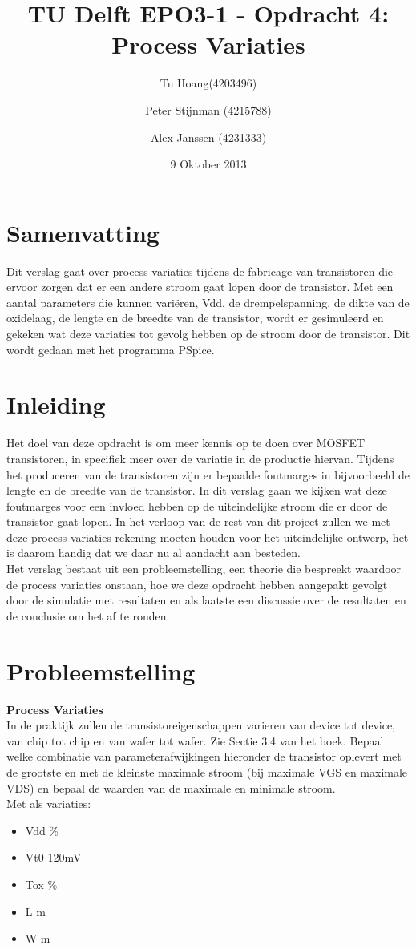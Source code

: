 \documentclass{article}
\author{
Tu Hoang(4203496) \and Peter Stijnman (4215788) \and Alex Janssen (4231333) \\
}
\title{TU Delft EPO3-1 - Opdracht 4: Process Variaties}
\date{9 Oktober 2013}
\begin{document}
\maketitle

\section{Samenvatting}

Dit verslag gaat over process variaties tijdens de fabricage van transistoren die ervoor zorgen dat er een andere stroom gaat lopen door de transistor. Met een aantal parameters die kunnen variëren, Vdd, de drempelspanning, de dikte van de oxidelaag, de lengte en de breedte van de transistor, wordt er gesimuleerd en gekeken wat deze variaties tot gevolg hebben op de stroom door de transistor. Dit wordt gedaan met het programma PSpice. 

\tableofcontents
\clearpage

\section{Inleiding}
Het doel van deze opdracht is om meer kennis op te doen over MOSFET transistoren, in specifiek meer over de variatie in de productie hiervan. Tijdens het produceren van de transistoren zijn er bepaalde foutmarges in bijvoorbeeld de lengte en de breedte van de transistor. In dit verslag gaan we kijken wat deze foutmarges voor een invloed hebben op de uiteindelijke stroom die er door de transistor gaat lopen. In het verloop van de rest van dit project zullen we met deze process variaties rekening moeten houden voor het uiteindelijke ontwerp, het is daarom handig dat we daar nu al aandacht aan besteden.\\
Het verslag bestaat uit een probleemstelling, een theorie die bespreekt waardoor de process variaties onstaan, hoe we deze opdracht hebben aangepakt gevolgt door de simulatie met resultaten en als laatste een discussie over de resultaten en de conclusie om het af te ronden.

\section{Probleemstelling}
\textbf{Process Variaties}\\
In de praktijk zullen de transistoreigenschappen varieren van device tot device, van chip tot chip en van 
wafer tot wafer. Zie Sectie 3.4 van het boek. Bepaal welke combinatie van parameterafwijkingen hieronder
de transistor oplevert met de grootste en met de kleinste maximale stroom (bij maximale VGS en maximale
VDS) en bepaal de waarden van de maximale en minimale stroom.\\
Met als variaties:
\newline
\begin {itemize}
	\item Vdd \%
	\item Vt0  \pm 120mV
	\item Tox \%
	\item L \textmu m
	\item W \textmu m
\end {itemize}
\end{document}
